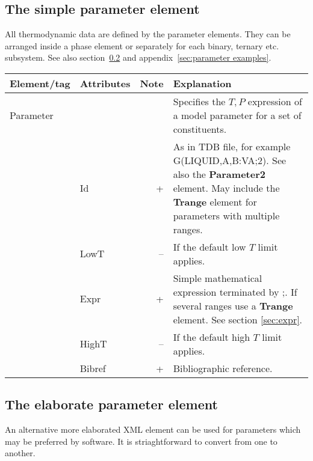 \documentclass{article}
\begin{document}

\subsection{The simple parameter element}

All thermodynamic data are defined by the parameter elements.  They
can be arranged inside a phase element or separately for each binary,
ternary etc. subsystem.  See also section~\ref{sec:parameter2} and
  appendix~\ref{sec:parameter examples}.

\bigskip
\begin{tabular}{|p{} p{} r p{}|}\hline
  Element/tag & Attributes & Note & Explanation\\\hline

  Parameter & && Specifies the $T, P$ expression of a model parameter for a set of constituents.\\
      & Id & + & As in TDB file, for example G(LIQUID,A,B:VA;2).  See also the {\bf Parameter2} element.  May include the {\bf Trange} element for parameters with multiple ranges.\\
      & LowT & -- & If the default low $T$ limit applies.\\
      & Expr & + & Simple mathematical expression terminated by ;.  If several ranges use a {\bf Trange} element.  See section \ref{sec:expr}.\\
      & HighT & -- & If the default high $T$ limit applies.\\
      & Bibref & + & Bibliographic reference.\\\hline
\end{tabular}

\subsection{The elaborate parameter element}\label{sec:parameter2}

An alternative more elaborated XML element can be used for parameters
which may be preferred by software.  It is striaghtforward to convert
from one to another.
\end{document}
